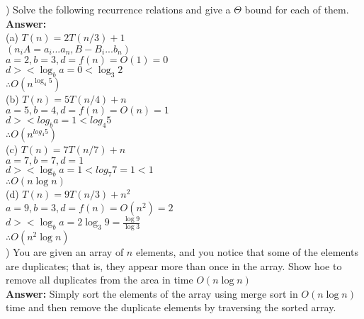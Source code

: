\documentclass{article}
\begin{document}
\vspace{.3in}
) Solve the following recurrence relations and give a $\Theta$ bound for each of them.\\
\vspace{.1in}
{\bf Answer:} \\
\indent (a) $T(n) = 2T(n/3) + 1$ \\
\indent \indent $(n_{i} A = a_{i} ...a_{n}, B - B_{i} ...b_{n})$ \\
\indent \indent $a = 2, b = 3, d = f(n) = O(1) = 0 $ \\
\indent \indent $d>< \log_b a = 0 < \log_3 2$ \\
\indent \indent $\therefore O(n^{\log_4 5})$ \\

\indent (b) $T(n) = 5T(n/4) + n$ \\
\indent \indent $a = 5, b = 4, d = f(n) = O(n) = 1$ \\
\indent \indent $d ><log_b a = 1 < log_4 5$ \\
\indent \indent $\therefore O(n^{log_4 5})$ \\

\indent (c) $T(n) = 7T(n/7) + n$ \\
\indent \indent $a = 7, b = 7, d = 1$ \\
\indent \indent $d >< \log_b a = 1 < log_7 7 = 1 < 1$ \\
\indent \indent $\therefore O(n \log n)$ \\

\indent (d) $T(n) = 9T(n/3) + n^2$ \\
\indent \indent $a = 9, b = 3, d = f(n) = O(n^2) = 2$ \\
\indent \indent $d >< \log_b a = 2 \log_3 9 = \frac{\log 9} {\log 3}$ \\
\indent \indent $\therefore O(n^{2} \log n)$ \\

\vspace{.3in}
) You are given an array of $n$ elements, and you notice that some of the elements are duplicates; that is, they appear more than once in the array. Show hoe to remove all duplicates from the area in time $O(n \log n)$\\
\vspace{.1in}
{\bf Answer:} Simply sort the elements of the array using merge sort in $O(n \log n)$ time and then remove the duplicate elements by traversing the sorted array.\\
\end{document}
